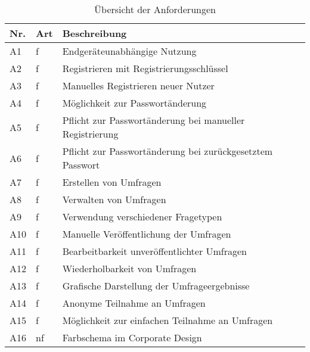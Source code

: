 \begin{table}
  \setlength\extrarowheight{3pt}
\centering
  \begin{tabular}{|C{1cm}|C{1cm}|L{12cm}|}
    \hline
    \textbf{Nr.} & \textbf{Art} & \textbf{Beschreibung} \\
    \hline
    {\label{Anf:A1}A1} & f & Endgeräteunabhängige Nutzung \\
    \hline
    {\label{Anf:A2}A2} & f & Registrieren mit Registrierungsschlüssel \\
    \hline
    {\label{Anf:A3}A3} & f & Manuelles Registrieren neuer Nutzer \\
    \hline
    {\label{Anf:A4}A4} & f & Möglichkeit zur Passwortänderung \\
    \hline
    {\label{Anf:A5}A5} & f & Pflicht zur Passwortänderung bei manueller Registrierung \\
    \hline
    {\label{Anf:A6}A6} & f & Pflicht zur Passwortänderung bei zurückgesetztem Passwort \\
    \hline
    {\label{Anf:A7}A7} & f & Erstellen von Umfragen \\
    \hline
    {\label{Anf:A8}A8} & f & Verwalten von Umfragen \\
    \hline
    {\label{Anf:A9}A9} & f & Verwendung verschiedener Fragetypen \\
    \hline
    {\label{Anf:A10}A10} & f & Manuelle Veröffentlichung der Umfragen \\
    \hline
    {\label{Anf:A11}A11} & f & Bearbeitbarkeit unveröffentlichter Umfragen \\
    \hline
    {\label{Anf:A12}A12} & f & Wiederholbarkeit von Umfragen \\
    \hline
    {\label{Anf:A13}A13} & f & Grafische Darstellung der Umfrageergebnisse \\
    \hline
    {\label{Anf:A14}A14} & f & Anonyme Teilnahme an Umfragen \\
    \hline
    {\label{Anf:A15}A15} & f & Möglichkeit zur einfachen Teilnahme an Umfragen \\
    \hline
    {\label{Anf:A16}A16} & nf & Farbschema im Corporate Design \\
    \hline
  \end{tabular}
  \caption{Übersicht der Anforderungen}
  \label{tab:Anforderungen}
\end{table}
